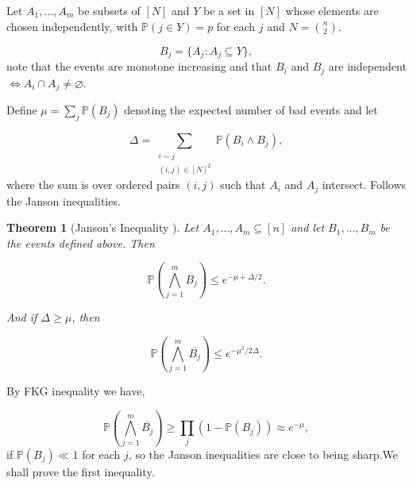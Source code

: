 \documentclass[12pt,twoside,a4paper,bibliography=totocnumbered]{book}
\numberwithin{equation}{section}
\let\emptyset=\varnothing
\newtheorem{theorem}             {Theorem}[section]
\theoremstyle{remark}
\begin{document}
Let $A_1, ... , A_m$ be subsets of $[N]$ and $Y$ be a set in $[N]$ whose elements are chosen independently, with $\mathbb{P}(j \in Y) = p$ for each $j$ and $N=\binom{n}{2}$. 

$$ B_j = \{A_j \colon A_j \subseteq Y\},$$
note that the events are monotone increasing and that $B_i$ and $B_j$ are independent $\iff A_i \cap A_j \neq \emptyset$. 

Define $\mu = \sum_j \mathbb{P}(B_j)$ denoting the expected number of bad events and let

$$ \Delta = \sum_{\substack{i\sim j\\ (i,j) \in [N]^2}} \mathbb{P}(B_i \wedge B_j), $$
where the sum is over ordered pairs $(i,j)$ such that $A_i$ and $A_j$ intersect. Follows the Janson inequalities.

\begin{theorem}[{Janson's Inequality \cite{Ja87}}]
Let $A_1,...,A_m \subseteq [n]$ and let $B_1,...,B_m$ be the events defined above. Then

$$ \mathbb{P}\left(\bigwedge_{j=1}^m \overline{B_j}\right) \leq e^{-\mu + \Delta/2}. $$

And if $\Delta \geq \mu$, then

$$ \mathbb{P}\left( \bigwedge_{j=1}^m \overline{B_j} \right) \leq e^{-\mu ^2 /2\Delta}.$$
\end{theorem}
By FKG inequality we have,

$$ \mathbb{P}\left( \bigwedge_{j=1}^m \overline{B_j} \right) \geq \prod_j (1-\mathbb{P}(B_j)) \approx e^{-\mu}, $$
if $\mathbb{P}(B_j) \ll 1$ for each $j$, so the Janson inequalities are close to being sharp.We shall prove the first inequality.
\end{document}
